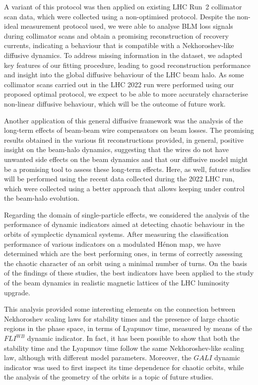 A variant of this protocol was then applied on existing LHC Run~2 collimator scan data, which were collected using a non-optimised protocol. Despite the non-ideal measurement protocol used, we were able to analyse BLM loss signals during collimator scans and obtain a promising reconstruction of recovery currents, indicating a behaviour that is compatible with a Nekhoroshev-like diffusive dynamics. To address missing information in the dataset, we adapted key features of our fitting procedure, leading to good reconstruction performance and insight into the global diffusive behaviour of the LHC beam halo. As some collimator scans carried out in the LHC 2022 run were performed using our proposed optimal protocol, we expect to be able to more accurately characterise non-linear diffusive behaviour, which will be the outcome of future work.

Another application of this general diffusive framework was the analysis of the long-term effects of beam-beam wire compensators on beam losses. The promising results obtained in the various fit reconstructions provided, in general, positive insight on the beam-halo dynamics, suggesting that the wires do not have unwanted side effects on the beam dynamics and that our diffusive model might be a promising tool to assess these long-term effects. Here, as well, future studies will be performed using the recent data collected during the 2022 LHC run, which were collected using a better approach that allows keeping under control the beam-halo evolution.

Regarding the domain of single-particle effects, we considered the analysis of the performance of dynamic indicators aimed at detecting chaotic behaviour in the orbits of symplectic dynamical systems. After measuring the classification performance of various indicators on a modulated Hénon map, we have determined which are the best performing ones, in terms of correctly assessing the chaotic character of an orbit using a minimal number of turns. On the basis of the findings of these studies, the best indicators have been applied to the study of the beam dynamics in realistic magnetic lattices of the LHC luminosity upgrade.

This analysis provided some interesting elements on the connection between Nekhoroshev scaling laws for stability times and the presence of large chaotic regions in the phase space, in terms of Lyapunov time, measured by means of the $FLI^{WB}$ dynamic indicator. In fact, it has been possible to show that both the stability time and the Lyapunov time follow the same Nekhoroshev-like scaling law, although with different model parameters. Moreover, the $GALI$ dynamic indicator was used to first inspect its time dependence for chaotic orbits, while the analysis of the geometry of the orbits is a topic of future studies.

